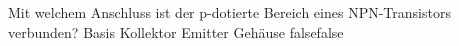     {Mit welchem Anschluss ist der p-dotierte Bereich eines NPN-Transistors verbunden?}
    {Basis}
    {Kollektor}
    {Emitter}
    {Gehäuse}
    {false}{false}